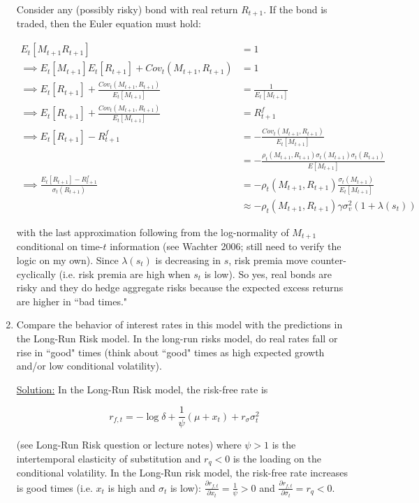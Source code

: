 \documentclass{article}
\begin{document}
\begin{enumerate}
\bigskip

Consider any (possibly risky) bond with real return $R_{t+1}$. If the bond is traded, then the Euler equation must hold:

\begin{align*}
E_t[M_{t+1} R_{t+1}] &= 1\\
\implies
E_t[M_{t+1}] E_t[R_{t+1}] + Cov_t(M_{t+1}, R_{t+1})&= 1\\
\implies
E_t[R_{t+1}] + \frac{Cov_t(M_{t+1}, R_{t+1})}{E_t[M_{t+1}] }&= \frac{1}{E_t[M_{t+1}] }\\
\implies
E_t[R_{t+1}] + \frac{Cov_t(M_{t+1}, R_{t+1})}{E_t[M_{t+1}] }&= R^f_{t+1}\\
\implies
E_t[R_{t+1}] - R^f_{t+1} 
&= -\frac{Cov_t(M_{t+1}, R_{t+1})}{E_t[M_{t+1}] } \\
&= -\frac{\rho_t(M_{t+1}, R_{t+1}) \sigma_t(M_{t+1})\sigma_t(R_{t+1})}{E[M_{t+1}] } \\
\implies
\frac{E_t[R_{t+1}] - R^f_{t+1} }{\sigma_t(R_{t+1})}
&= - \rho_t(M_{t+1}, R_{t+1}) \frac{\sigma_t(M_{t+1}) }{E_t[M_{t+1}] } \\
&\approx - \rho_t(M_{t+1}, R_{t+1}) \gamma \sigma_v^2(1+\lambda(s_t))
\end{align*}

with the last approximation following from the log-normality of $M_{t+1}$ conditional on time-$t$ information (see Wachter 2006; still need to verify the logic on my own).  Since $\lambda(s_t)$ is decreasing in $s$, risk premia move counter-cyclically (i.e. risk premia are high when $s_t$ is low).  So yes, real bonds are risky and they do hedge aggregate risks because the expected excess returns are higher in ``bad times."

\item Compare the behavior of interest rates in this model with the predictions in the Long-Run Risk model.  In the long-run risks model, do real rates fall or rise in ``good" times (think about ``good" times as high expected growth and/or low conditional volatility).

\underline{Solution:}  In the Long-Run Risk model, the risk-free rate is

$$
r_{f,t} = -\log \delta + \frac{1}{\psi} (\mu + x_t) + r_\sigma \sigma_t^2
$$

(see Long-Run Risk question or lecture notes) where $\psi > 1$ is the intertemporal elasticity of substitution and $r_q < 0$ is the loading on the conditional volatility.  In the Long-Run risk model, the risk-free rate increases is good times (i.e. $x_t$ is high and $\sigma_t$ is low): $\frac{\partial r_{f,t}}{\partial x_t} = \frac{1}{\psi} > 0$ and $\frac{\partial r_{f,t}}{\partial \sigma_t} = r_q < 0$. 


\end{enumerate}
\end{document}
